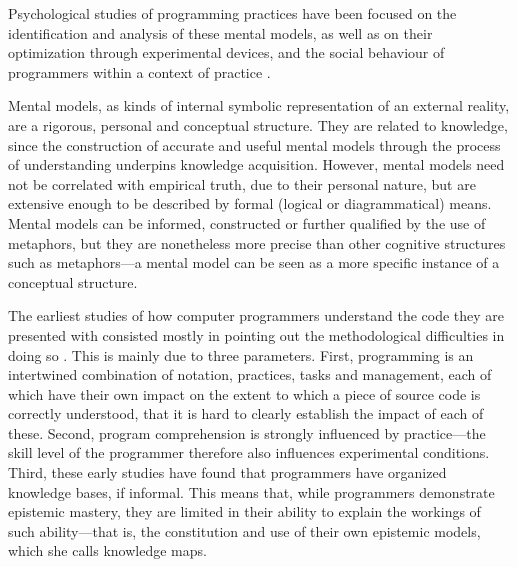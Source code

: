 Psychological studies of programming practices have been focused on the identification and analysis of these mental models, as well as on their optimization through experimental devices, and the social behaviour of programmers within a context of practice \citep{weinberg_psychology_1998}.

Mental models, as kinds of internal symbolic representation of an external reality, are a rigorous, personal and conceptual structure. They are related to knowledge, since the construction of accurate and useful mental models through the process of understanding underpins knowledge acquisition. However, mental models need not be correlated with empirical truth, due to their personal nature, but are extensive enough to be described by formal (logical or diagrammatical) means. Mental models can be informed, constructed or further qualified by the use of metaphors, but they are nonetheless more precise than other cognitive structures such as metaphors—a mental model can be seen as a more specific instance of a conceptual structure.

The earliest studies of how computer programmers understand the code they are presented with consisted mostly in pointing out the methodological difficulties in doing so \citep{sheil_psychological_1981,shneiderman_measuring_1977}. This is mainly due to three parameters. First, programming is an intertwined combination of notation, practices, tasks and management, each of which have their own impact on the extent to which a piece of source code is correctly understood, that it is hard to clearly establish the impact of each of these. Second, program comprehension is strongly influenced by practice—the skill level of the programmer therefore also influences experimental conditions. Third, these early studies have found that programmers have organized knowledge bases, if informal. This means that, while programmers demonstrate epistemic mastery, they are limited in their ability to explain the workings of such ability—that is, the constitution and use of their own epistemic models, which she calls knowledge maps.

